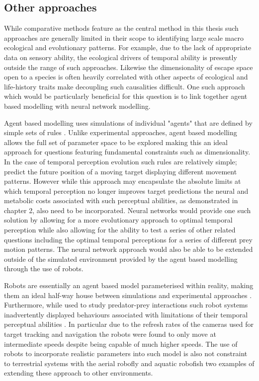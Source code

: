 \subsection{Other approaches}

While comparative methods feature as the central method in this thesis such approaches are generally limited in their scope to identifying large scale macro ecological and evolutionary patterns. For example, due to the lack of appropriate data on sensory ability, the ecological drivers of temporal ability is presently outside the range of such approaches. Likewise the dimensionality of escape space open to a species is often heavily correlated with other aspects of ecological and life-history traits make decoupling such causalities difficult. One such approach which would be particularly beneficial for this question is to link together agent based modelling with neural network modelling. 


Agent based modelling uses simulations of individual "agents" that are defined by simple sets of rules \citep{tisue2004netlogo}. Unlike experimental approaches, agent based modelling allows the full set of parameter space to be explored making this an ideal approach for questions featuring fundamental constraints such as dimensionality. In the case of temporal perception evolution such rules are relatively simple; predict the future position of a moving target displaying different movement patterns. However while this approach may encapsulate the absolute limits at which temporal perception no longer improves target predictions the neural and metabolic costs associated with such perceptual abilities, as demonstrated in chapter 2, also need to be incorporated. Neural networks would provide one such solution by allowing for a more evolutionary approach to optimal temporal perception while also allowing for the ability to test a series of other related questions including the optimal temporal perceptions for a series of different prey motion patterns. The neural network approach would also be able to be extended outside of the simulated environment provided by the agent based modelling through the use of robots. 


Robots are essentially an agent based model parameterised within reality, making them an ideal half-way house between simulations and experimental approaches \citep{floreano2010evolution}. Furthermore, while used to study predator-prey interactions such robot systems inadvertently displayed behaviours associated with limitations of their temporal perceptual abilities \citep{floreano2010evolution}. In particular due to the refresh rates of the cameras used for target tracking and navigation the robots were found to only move at intermediate speeds despite being capable of much higher speeds. The use of robots to incorporate realistic parameters into such model is also not constraint to terrestrial systems with the aerial robofly \citep{lauder2001aerodynamics} and aquatic robofish \citep{faria2010novel} two examples of extending these approach to other environments.


